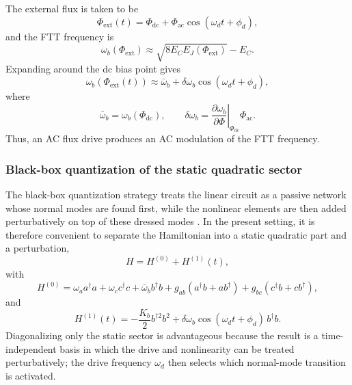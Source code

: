 The external flux is taken to be
\begin{equation}
    \Phi_{\mathrm{ext}}(t)
    =
    \Phi_{\mathrm{dc}}
    +
    \Phi_{\mathrm{ac}}\cos(\omega_d t+\phi_d),
    \label{eq:flux_drive}
\end{equation}
and the FTT frequency is
\begin{equation}
    \omega_b(\Phi_{\mathrm{ext}})
    \approx
    \sqrt{8E_C E_J(\Phi_{\mathrm{ext}})}
    -
    E_C .
    \label{eq:omegab_flux}
\end{equation}
Expanding around the dc bias point gives
\begin{equation}
    \omega_b\!\left(\Phi_{\mathrm{ext}}(t)\right)
    \approx
    \bar\omega_b
    +
    \delta\omega_b \cos(\omega_d t+\phi_d),
    \label{eq:omegab_expand}
\end{equation}
where
\begin{equation}
    \bar\omega_b = \omega_b(\Phi_{\mathrm{dc}}),
    \qquad
    \delta\omega_b
    =
    \left.
    \frac{\partial \omega_b}{\partial \Phi}
    \right|_{\Phi_{\mathrm{dc}}}
    \Phi_{\mathrm{ac}} .
\end{equation}
Thus, an AC flux drive produces an AC modulation of the FTT frequency.

\subsubsection{Black-box quantization of the static quadratic sector}

The black-box quantization strategy treats the linear circuit as a passive network whose normal modes are found first, while the nonlinear elements are then added perturbatively on top of these dressed modes \cite{PhysRevLett.108.240502bbq}. In the present setting, it is therefore convenient to separate the Hamiltonian into a static quadratic part and a perturbation,
\begin{equation}
    H
    =
    H^{(0)}
    +
    H^{(1)}(t),
\end{equation}
with
\begin{equation}
    H^{(0)}
    =
    \omega_a a^\dagger a
    +
    \omega_c c^\dagger c
    +
    \bar\omega_b b^\dagger b
    +
    g_{ab}(a^\dagger b + a b^\dagger)
    +
    g_{bc}(c^\dagger b + c b^\dagger),
    \label{eq:H0_static}
\end{equation}
and
\begin{equation}
    H^{(1)}(t)
    =
    -\frac{K_b}{2}b^{\dagger 2}b^2
    +
    \delta\omega_b \cos(\omega_d t+\phi_d)\,b^\dagger b .
    \label{eq:H1_pert}
\end{equation}
Diagonalizing only the static sector is advantageous because the result is a time-independent basis in which the drive and nonlinearity can be treated perturbatively; the drive frequency \(\omega_d\) then selects which normal-mode transition is activated.


